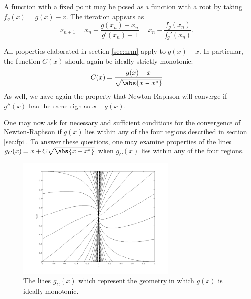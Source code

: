 \documentclass{article}
\begin{document}
A function with a fixed point may be posed as a function with a root by taking $f_g(x) = g(x) - x$.
The iteration appears as
\begin{equation*}
x_{n+1} = x_n - \frac{g(x_n) - x_n}{g'(x_n) - 1} = x_n - \frac{f_g(x_n)}{f_g'(x_n)} .
\end{equation*}

All properties elaborated in section \ref{sec:nrm} apply to $g(x) - x$.
In particular, the function $C(x)$ should again be ideally strictly monotonic:
\begin{equation*}
C(x) = \frac{g(x) - x}{\sqrt{\abs{x-x^*}}}
\end{equation*}
As well, we have again the property that Newton-Raphson will converge if $g''(x)$ has the same sign as $x-g(x)$.

One may now ask for necessary and sufficient conditions for the convergence of Newton-Raphson if $g(x)$ lies within any of the four regions described in section \ref{sec:fpi}.
To answer these questions, one may examine properties of the lines $g_C(x) = x + C \sqrt{\abs{x-x^*}}$ when $g_C(x)$ lies within any of the four regions.

\begin{figure}
\centering
\includegraphics[width=0.7\textwidth]{clines.png}
\caption{The lines $g_C(x)$ which represent the geometry in which $g(x)$ is ideally monotonic.}
\label{fig:Clines}
\end{figure}
\end{document}
